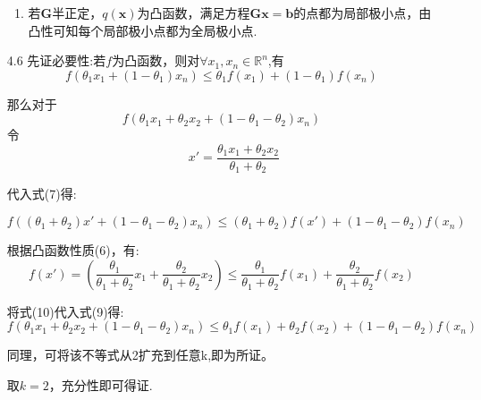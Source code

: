 \documentclass[UTF8]{ctexart}
\begin{document}
\begin{enumerate}
\begin{enumerate}
\item 若$\bm{G}$半正定，$q(\bm{x})$为凸函数，满足方程$\bm{G}\bm{x}=\bm{b}$的点都为局部极小点，由凸性可知每个局部极小点都为全局极小点.


\end{enumerate}

\newpage
\item[4.6]
先证必要性:若$f$为凸函数，则对$\forall x_1,x_n \in \mathbb{R}^n$,有
\begin{equation}
f(\theta_1x_1+(1-\theta_1)x_n)\leq \theta_1f(x_1)+(1-\theta_1)f(x_n)
\end{equation}

那么对于
\begin{equation}
f(\theta_1x_1+\theta_2x_2+(1-\theta_1-\theta_2)x_n)
\end{equation}
令
\begin{equation}
\qquad x'=\dfrac{\theta_1x_1+\theta_2x_2}{\theta_1+\theta_2}
\end{equation}

代入式(7)得:

\begin{equation}
f((\theta_1+\theta_2)x'+(1-\theta_1-\theta_2)x_n)\leq (\theta_1+\theta_2)f(x')+(1-\theta_1-\theta_2)f(x_n)
\end{equation}

根据凸函数性质(6)，有:
\begin{equation}
f(x')=(\dfrac{\theta_1}{\theta_1+\theta_2}x_1+\dfrac{\theta_2}{\theta_1+\theta_2}x_2)\leq \dfrac{\theta_1}{\theta_1+\theta_2}f(x_1)+\dfrac{\theta_2}{\theta_1+\theta_2}f(x_2)
\end{equation}

将式(10)代入式(9)得:
\begin{equation}
f(\theta_1x_1+\theta_2x_2+(1-\theta_1-\theta_2)x_n)\leq 
\theta_1f(x_1)+\theta_2f(x_2)+(1-\theta_1-\theta_2)f(x_n)
\end{equation}

同理，可将该不等式从2扩充到任意k,即为所证。

取$k=2$，充分性即可得证.






\end{enumerate}
\end{document}
